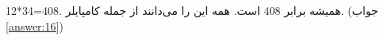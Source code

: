 \section{}
\paragraph{}\label{hint:342}
12*34=408. همیشه برابر 408 است. همه این را می‌دانند از جمله کامپایلر. (جواب \ref{answer:16})